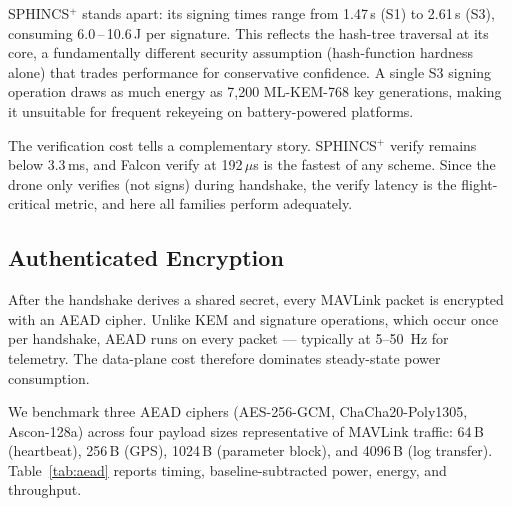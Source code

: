 \documentclass[conference]{IEEEtran}
\begin{document}
SPHINCS$^+$ stands apart: its signing times range from 1.47\,s (S1)
to 2.61\,s (S3), consuming 6.0\,--\,10.6\,J per signature.  This
reflects the hash-tree traversal at its core, a fundamentally
different security assumption (hash-function hardness alone) that
trades performance for conservative confidence.  A single S3 signing
operation draws as much energy as 7{,}200 ML-KEM-768 key generations,
making it unsuitable for frequent rekeyeing on battery-powered
platforms.

The verification cost tells a complementary story.  SPHINCS$^+$ verify
remains below 3.3\,ms, and Falcon verify at 192\,$\mu$s is the
fastest of any scheme.  Since the drone only verifies (not signs)
during handshake, the verify latency is the flight-critical metric,
and here all families perform adequately.

\subsection{Authenticated Encryption}
\label{sec:aead}

After the handshake derives a shared secret, every MAVLink packet is
encrypted with an AEAD cipher.  Unlike KEM and signature operations, which
occur once per handshake, AEAD runs on every packet — typically at
5--50~Hz for telemetry.  The data-plane cost therefore dominates
steady-state power consumption.

We benchmark three AEAD ciphers (AES-256-GCM, ChaCha20-Poly1305,
Ascon-128a) across four payload sizes representative of MAVLink
traffic: 64\,B (heartbeat), 256\,B (GPS), 1024\,B (parameter
block), and 4096\,B (log transfer).  Table~\ref{tab:aead} reports
timing, baseline-subtracted power, energy, and throughput.
\end{document}
